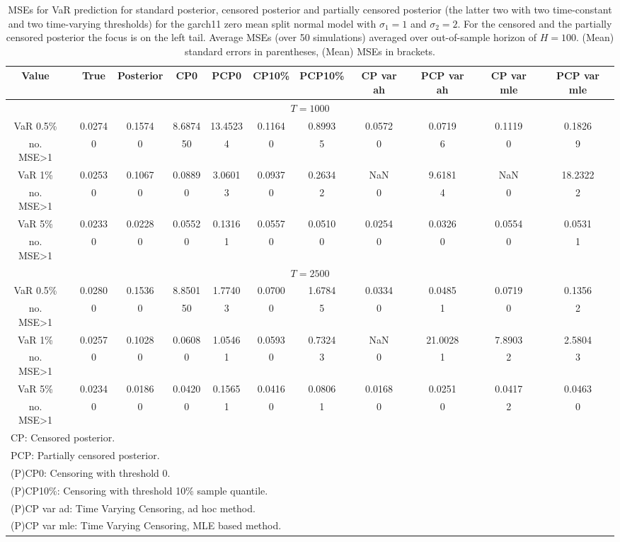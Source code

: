 { \renewcommand{\arraystretch}{1.2} 
\begin{sidewaystable} 
\center 
\begin{tabular}{cc cc cccc cccc} 
Value && True & Posterior & CP0  & PCP0 & CP10\%  & PCP10\% &CP var ah & PCP var ah & CP var mle & PCP var mle \\ \hline 
\hline 
\multicolumn{12}{c}{$T =1000$}  \\ 
\hline 
VaR 0.5\% && 0.0274 & 0.1574 & 8.6874 & 13.4523 & 0.1164 & 0.8993 &0.0572 & 0.0719 & 0.1119 & 0.1826 \\ 
no. MSE>1 && 0 & 0 & 50 & 4 & 0 & 5 &0 & 6 & 0 & 9 \\[1ex] 
VaR 1\% && 0.0253 & 0.1067 & 0.0889 & 3.0601 & 0.0937 & 0.2634 &   NaN & 9.6181 &    NaN & 18.2322 \\ 
no. MSE>1 && 0 & 0 & 0 & 3 & 0 & 2 &0 & 4 & 0 & 2 \\[1ex] 
VaR 5\% && 0.0233 & 0.0228 & 0.0552 & 0.1316 & 0.0557 & 0.0510 &0.0254 & 0.0326 & 0.0554 & 0.0531 \\ 
no. MSE>1 && 0 & 0 & 0 & 1 & 0 & 0 &0 & 0 & 0 & 1 \\[1ex] 
\hline 
\multicolumn{12}{c}{$T =2500$}  \\ 
\hline 
VaR 0.5\% && 0.0280 & 0.1536 & 8.8501 & 1.7740 & 0.0700 & 1.6784 &0.0334 & 0.0485 & 0.0719 & 0.1356 \\ 
no. MSE>1 && 0 & 0 & 50 & 3 & 0 & 5 &0 & 1 & 0 & 2 \\[1ex] 
VaR 1\% && 0.0257 & 0.1028 & 0.0608 & 1.0546 & 0.0593 & 0.7324 &   NaN & 21.0028 & 7.8903 & 2.5804 \\ 
no. MSE>1 && 0 & 0 & 0 & 1 & 0 & 3 &0 & 1 & 2 & 3 \\[1ex] 
VaR 5\% && 0.0234 & 0.0186 & 0.0420 & 0.1565 & 0.0416 & 0.0806 &0.0168 & 0.0251 & 0.0417 & 0.0463 \\ 
no. MSE>1 && 0 & 0 & 0 & 1 & 0 & 1 &0 & 0 & 2 & 0 \\[1ex] 
\hline 
\multicolumn{12}{l}{\footnotesize{CP: Censored posterior.}}  \\ 
\multicolumn{12}{l}{\footnotesize{PCP: Partially censored posterior.}} \\ 
\multicolumn{12}{l}{\footnotesize{(P)CP0: Censoring with threshold 0.}} \\ 
\multicolumn{12}{l}{\footnotesize{(P)CP10\%: Censoring with threshold 10\% sample quantile.}}  \\ 
\multicolumn{12}{l}{\footnotesize{(P)CP var ad: Time Varying Censoring, ad hoc method.}} \\ 
\multicolumn{12}{l}{\footnotesize{(P)CP var mle: Time Varying Censoring, MLE based method.}}  \\ 
\end{tabular}
 \caption{MSEs for VaR prediction for standard posterior, censored posterior and partially censored posterior (the latter two with two time-constant and two time-varying thresholds) for the garch11 zero mean split normal model with $\sigma_{1} = 1$ and $\sigma_{2} = 2$. For the censored and the partially censored posterior the focus is on the left tail. Average MSEs (over 50 simulations) averaged over out-of-sample horizon of $H=100$. (Mean) standard errors in parentheses, (Mean) MSEs in brackets.} 
\label{tab:garch11_pcp_var}  
\end{sidewaystable}
}